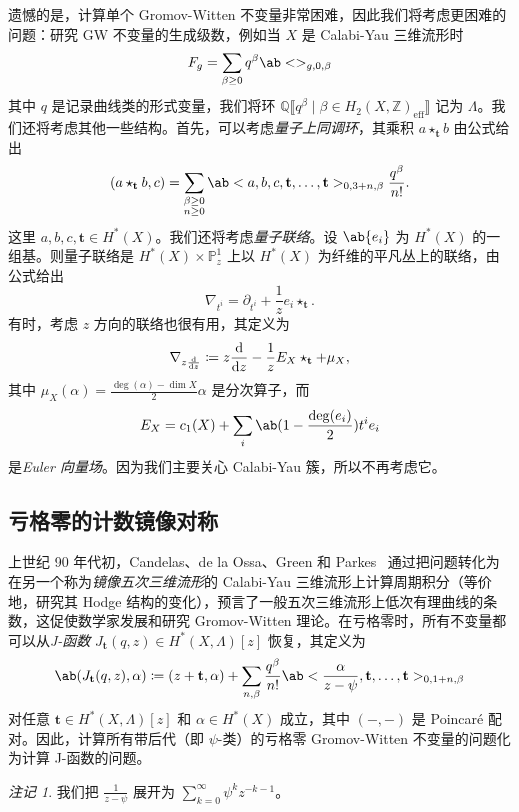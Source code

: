 \documentclass{amsart}
\theoremstyle{definition}
\theoremstyle{remark}
\newtheorem{rmk}[thm]{注记}
\theoremstyle{plain}
\theoremstyle{definition}
\theoremstyle{remark}
\newcommand{\Z}{\mathbb{Z}}
\newcommand{\Q}{\mathbb{Q}}
\renewcommand{\P}{\mathbb{P}}
\newcommand{\mbf}[1]{\mathbf{#1}}
\newcommand{\mr}[1]{\mathrm{#1}}
\newcommand{\1}{\mathbf{1}}
\newcommand{\2}{\mathbf{2}}
\newcommand{\3}{\mathbf{3}}
\newcommand{\ps}[1]{\llbracket #1 \rrbracket}
\begin{document}
遗憾的是，计算单个 Gromov-Witten 不变量非常困难，因此我们将考虑更困难的问题：研究 GW 不变量的生成级数，例如当 \(X\) 是 Calabi-Yau 三维流形时
\[ F_g = \sum_{\beta \geq 0} q^{\beta} \ab<>_{g,0,\beta} \]
其中 \(q\) 是记录曲线类的形式变量，我们将环 \(\Q\ps{q^{\beta} \mid \beta \in H_2(X, \Z)_{\mr{eff}}}\) 记为 \(\Lambda\)。我们还将考虑其他一些结构。首先，可以考虑\textit{量子上同调环}，其乘积 \(a \star_{\mbf{t}} b\) 由公式给出
\[
    (a \star_{\mbf{t}} b, c) = \sum_{\substack{\beta \geq 0 \\ n \geq 0}} \ab<a,b,c, \mbf{t}, \ldots, \mbf{t}>_{0,3+n,\beta} \frac{q^{\beta}}{n!}.
\]
这里 \(a,b,c, \mbf{t} \in H^*(X)\)。我们还将考虑\textit{量子联络}。设 \(\ab\{ e_i \}\) 为 \(H^*(X)\) 的一组基。则量子联络是 \(H^*(X) \times \P^1_z\) 上以 \(H^*(X)\) 为纤维的平凡丛上的联络，由公式给出
\[ \nabla_{t^i} = \partial_{t^i} + \frac{1}{z} e_i \star_{\mbf{t}}. \]
有时，考虑 \(z\) 方向的联络也很有用，其定义为
\[ \nabla_{z \odv{}{z}} \coloneqq z \odv{}{z} - \frac{1}{z} E_X \star_{\mbf{t}} + \mu_X, \]
其中 \(\mu_X(\alpha) = \frac{\deg(\alpha) - \dim X}{2} \alpha\) 是分次算子，而
\[ E_X = c_1(X) + \sum_i \ab(1 - \frac{\deg(e_i)}{2})t^i e_i \]
是\textit{Euler 向量场}。因为我们主要关心 Calabi-Yau 簇，所以不再考虑它。

\subsection{亏格零的计数镜像对称}%
\label{sub:Enumerative mirror symmetry in genus zero}

上世纪 90 年代初，Candelas、de la Ossa、Green 和 Parkes~\cite{CandelasEtAl1991} 通过把问题转化为在另一个称为\textit{镜像五次三维流形}的 Calabi-Yau 三维流形上计算周期积分（等价地，研究其 Hodge 结构的变化），预言了一般五次三维流形上低次有理曲线的条数，这促使数学家发展和研究 Gromov-Witten 理论。在亏格零时，所有不变量都可以从\textit{J-函数} \(J_{\mbf{t}}(q,z) \in H^*(X, \Lambda)[z]\) 恢复，其定义为
\[ \ab( J_{\mbf{t}}(q, z), \alpha ) \coloneqq (z + \mbf{t}, \alpha) + \sum_{n, \beta} \frac{q^{\beta}}{n!} \ab< \frac{\alpha}{z-\psi}, \mbf{t}, \ldots, \mbf{t}>_{0,1+n, \beta} \]
对任意 \(\mbf{t} \in H^*(X, \Lambda)[z]\) 和 \(\alpha \in H^*(X)\) 成立，其中 \((-,-)\) 是 Poincar\'e 配对。因此，计算所有带后代（即 \(\psi\)-类）的亏格零 Gromov-Witten 不变量的问题化为计算 J-函数的问题。

\begin{rmk}
    我们把 \(\frac{1}{z-\psi}\) 展开为 \(\sum_{k=0}^{\infty} \psi^k z^{-k-1}\)。
\end{rmk}
\end{document}
